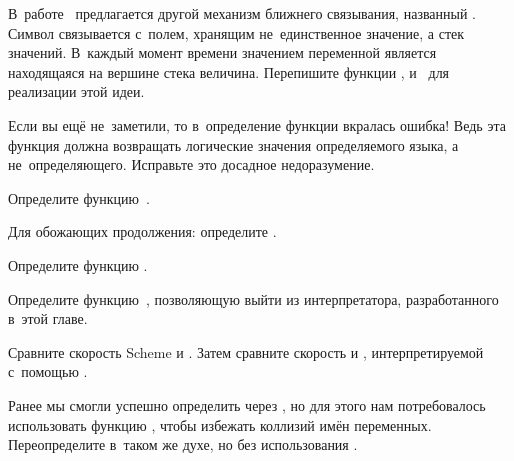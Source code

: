 \begin{exercise}\label{basics/ex:racks}
В~работе~\cite{ss80} предлагается другой механизм ближнего связывания, названный
. Символ связывается с~полем, хранящим не~единственное значение, а
стек значений. В~каждый момент времени значением переменной является находящаяся
на вершине стека величина. Перепишите функции ,
 и~ для реализации этой идеи.
\end{exercise}

\begin{exercise}\label{basics/ex:liar-liar!}
Если вы ещё не~заметили, то в~определение функции \ic{<} вкралась ошибка! Ведь
эта функция должна возвращать логические значения определяемого языка, а
не~определяющего. Исправьте это досадное недоразумение.
\end{exercise}

\begin{exercise}\label{basics/ex:def-list}
Определите функцию~.
\end{exercise}

\begin{exercise}\label{basics/ex:def-call/cc}
Для обожающих продолжения: определите .
\end{exercise}

\begin{exercise}\label{basics/ex:def-apply}
Определите функцию .
\end{exercise}

\begin{exercise}\label{basics/ex:def-end}
Определите функцию~, позволяющую выйти из интерпретатора, разработанного
в~этой главе.
\end{exercise}

\begin{exercise}\label{basics/ex:slowpoke}
Сравните скорость Scheme и . Затем сравните скорость 
и , интерпретируемой с~помощью .
\end{exercise}

\begin{exercise}\label{basics/ex:no-gensym}
Ранее мы смогли успешно определить  через 
, но для этого нам
потребовалось использовать функцию , чтобы избежать коллизий имён
переменных. Переопределите  в~таком же духе, но без использования
.
\end{exercise}


